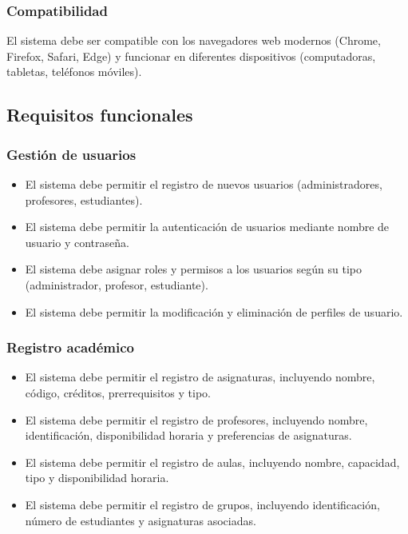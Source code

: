 \documentclass[12pt]{article} %
\begin{document}
    \subsubsection{Compatibilidad}
    \noindent
    El sistema debe ser compatible con los navegadores web modernos (Chrome, Firefox, Safari, Edge) y funcionar en diferentes dispositivos (computadoras, tabletas, teléfonos móviles).

\subsection{Requisitos funcionales}
    \subsubsection{Gestión de usuarios}
    \begin{itemize}
        \item El sistema debe permitir el registro de nuevos usuarios (administradores, profesores, estudiantes).
        \item El sistema debe permitir la autenticación de usuarios mediante nombre de usuario y contraseña.
        \item El sistema debe asignar roles y permisos a los usuarios según su tipo (administrador, profesor, estudiante).
        \item El sistema debe permitir la modificación y eliminación de perfiles de usuario.
    \end{itemize}
    
    \subsubsection{Registro académico}
    \begin{itemize}
        \item El sistema debe permitir el registro de asignaturas, incluyendo nombre, código, créditos, prerrequisitos y tipo.
        \item El sistema debe permitir el registro de profesores, incluyendo nombre, identificación, disponibilidad horaria y preferencias de asignaturas.
        \item El sistema debe permitir el registro de aulas, incluyendo nombre, capacidad, tipo y disponibilidad horaria.
        \item El sistema debe permitir el registro de grupos, incluyendo identificación, número de estudiantes y asignaturas asociadas.
    \end{itemize}
    
\end{document}
